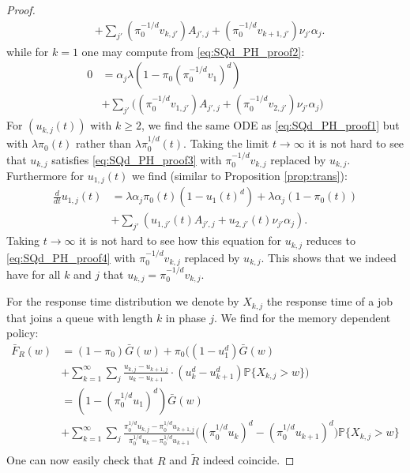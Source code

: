 \documentclass[12pt]{report}
\renewcommand{\P}{\mathbb{P}}
\renewcommand{\P}{\mathbb{P}}
\begin{document}
\begin{proof}
\begin{align}
&+ \sum_{j'} (\pi_0^{-1/d} v_{k,j'}) A_{j',j} + (\pi_0^{-1/d} v_{k+1,j'}) \nu_{j'} \alpha_j.\label{eq:SQd_PH_proof3}
\end{align}
while for $k=1$ one may compute from \eqref{eq:SQd_PH_proof2}:
\begin{align}
0
&=
\alpha_j \lambda \left(1- \pi_0 (\pi_0^{-1/d}v_1)^d \right)\nonumber\\
& + \sum_{j'} \bigg( (\pi_0^{-1/d} v_{1,j'}) A_{j',j} + (\pi_0^{-1/d} v_{2,j'})\nu_{j'} \alpha_j \bigg)\label{eq:SQd_PH_proof4}
\end{align}
For $(u_{k,j}(t))$ with $k\geq 2$, we find the same ODE as \eqref{eq:SQd_PH_proof1} but with $\lambda \pi_0(t)$ rather than $\lambda \pi_0^{1/d}(t)$. Taking the limit $t\rightarrow \infty$ it is not hard to see that $u_{k,j}$ satisfies \eqref{eq:SQd_PH_proof3} with $\pi_0^{-1/d} v_{k,j}$ replaced by $u_{k,j}$. Furthermore for $u_{1,j}(t)$ we find (similar to Proposition \ref{prop:trans}):
\begin{align*}
\frac{d}{dt} u_{1,j}(t)
&= \lambda \alpha_j \pi_0(t) (1-u_1(t)^d) + \lambda \alpha_j (1-\pi_0(t))\nonumber \\
& +\sum_{j'} (u_{1,j'}(t) A_{j',j} + u_{2,j'}(t) \nu_{j'} \alpha_j).
\end{align*}
Taking $t\rightarrow \infty$ it is not hard to see how this equation for $u_{k,j}$ reduces to \eqref{eq:SQd_PH_proof4} with $\pi_0^{-1/d} v_{k,j}$ replaced by $u_{k,j}$. This shows that we indeed have for all $k$ and $j$ that $u_{k,j}=\pi_0^{-1/d} v_{k,j}$.

For the response time distribution we denote by $X_{k,j}$ the response time of a job
that joins a queue with length $k$ in phase $j$. We find for the memory dependent policy:
\begin{align*}
\bar F_{R}(w)
&= (1-\pi_0) \bar G(w) + \pi_0 \bigg( (1-u_1^d) \bar G(w)\\
& + \sum_{k=1}^\infty \sum_j \frac{u_{k,j}-u_{k+1,j}}{u_k-u_{k+1}} \cdot (u_k^d-u_{k+1}^d) \P\{X_{k,j} > w\} \bigg)\\
&=(1-(\pi_0^{1/d} u_1)^d)\bar G(w) \\
& + \sum_{k=1}^\infty \sum_j \frac{\pi_0^{1/d}u_{k,j}-\pi_0^{1/d}u_{k+1,j}}{\pi_0^{1/d}u_{k}-\pi_0^{1/d}u_{k+1}}  \bigg((\pi_0^{1/d}u_{k})^d - (\pi_0^{1/d}u_{k+1})^d\bigg) \P\{X_{k,j} > w \}\\
\end{align*}
One can now easily check that $R$ and $\tilde R$ indeed coincide.
\end{proof}
\end{document}
